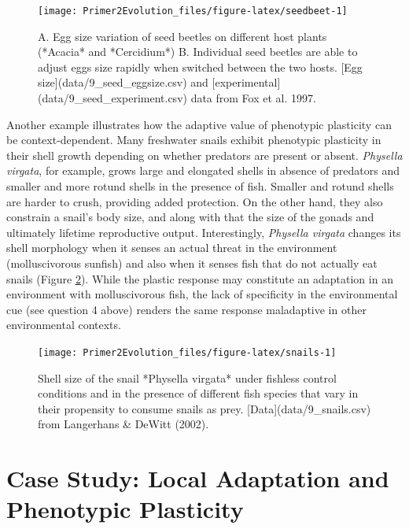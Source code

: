 \documentclass[
]{book}
\begin{document}
\begin{figure}
\texttt{[image: Primer2Evolution\_files/figure-latex/seedbeet-1]} \caption{A. Egg size variation of seed beetles on different host plants (*Acacia* and *Cercidium*) B. Individual seed beetles are able to adjust eggs size rapidly when switched between the two hosts. [Egg size](data/9_seed_eggsize.csv) and [experimental](data/9_seed_experiment.csv) data from Fox et al. 1997.}\label{fig:seedbeet}
\end{figure}

Another example illustrates how the adaptive value of phenotypic plasticity can be context-dependent. Many freshwater snails exhibit phenotypic plasticity in their shell growth depending on whether predators are present or absent. \emph{Physella virgata}, for example, grows large and elongated shells in absence of predators and smaller and more rotund shells in the presence of fish. Smaller and rotund shells are harder to crush, providing added protection. On the other hand, they also constrain a snail's body size, and along with that the size of the gonads and ultimately lifetime reproductive output. Interestingly, \emph{Physella virgata} changes its shell morphology when it senses an actual threat in the environment (molluscivorous sunfish) and also when it senses fish that do not actually eat snails (Figure \ref{fig:snails}). While the plastic response may constitute an adaptation in an environment with molluscivorous fish, the lack of specificity in the environmental cue (see question 4 above) renders the same response maladaptive in other environmental contexts.

\begin{figure}
\texttt{[image: Primer2Evolution\_files/figure-latex/snails-1]} \caption{Shell size of the snail *Physella virgata* under fishless control conditions and in the presence of different fish species that vary in their propensity to consume snails as prey. [Data](data/9_snails.csv) from Langerhans & DeWitt (2002).}\label{fig:snails}
\end{figure}

\hypertarget{case-study-local-adaptation-and-phenotypic-plasticity}{%
\section{Case Study: Local Adaptation and Phenotypic Plasticity}\label{case-study-local-adaptation-and-phenotypic-plasticity}}
\end{document}
